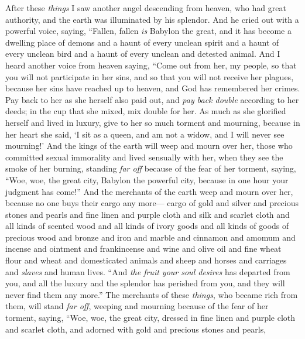 \begin{biblechapter} %
 After these \textit{things} I saw another angel descending from heaven, who had great authority, and the earth was illuminated by his splendor.
\verse And he cried out with a powerful voice, saying,
\verse “Fallen, fallen \textit{is} Babylon the great, 
and it has become a dwelling place of demons 
and a haunt of every unclean spirit 
and a haunt of every unclean bird 
and a haunt of every unclean and detested animal.
\verse And I heard another voice from heaven saying,
\verse “Come out from her, my people, 
so that you will not participate in her sins, 
and so that you will not receive her plagues,
\verse because her sins have reached up to heaven, 
and God has remembered her crimes.
\verse Pay back to her as she herself also paid out, 
and \textit{pay back double} according to her deeds; 
in the cup that she mixed, mix double for her.
\verse As much as she glorified herself and lived in luxury, 
give to her so much torment and mourning, 
because in her heart she said, 
‘I sit as a queen, and am not a widow, 
and I will never see mourning!’
\verse And the kings of the earth will weep and mourn over her, those who committed sexual immorality and lived sensually with her, when they see the smoke of her burning,
\verse standing \textit{far off} because of the fear of her torment, saying, “Woe, woe, the great city, 
Babylon the powerful city, 
because in one hour your judgment has come!”
\verse And the merchants of the earth weep and mourn over her, because no one buys their cargo any more—
\verse cargo of gold and silver and precious stones and pearls and fine linen and purple cloth and silk and scarlet cloth and all kinds of scented wood and all kinds of ivory goods and all kinds of goods of precious wood and bronze and iron and marble
\verse and cinnamon and amomum and incense and ointment and frankincense and wine and olive oil and fine wheat flour and wheat and domesticated animals and sheep and horses and carriages and \textit{slaves} and human lives.
\verse “And \textit{the fruit your soul desires} has departed from you, 
and all the luxury and the splendor has perished from you, 
and they will never find them any more.”
\verse The merchants of these \textit{things}, who became rich from them, will stand \textit{far off}, weeping and mourning because of the fear of her torment,
\verse saying,
\verse “Woe, woe, the great city, 
dressed in fine linen and purple cloth and scarlet cloth, 
and adorned with gold and precious stones and pearls,

\end{biblechapter}
